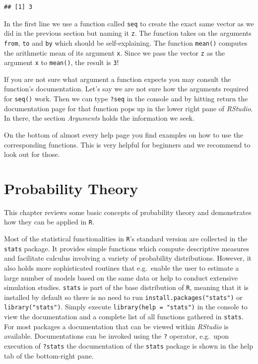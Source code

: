 \documentclass[]{book}
\theoremstyle{definition}
\theoremstyle{definition}
\theoremstyle{definition}
\theoremstyle{remark}
\begin{document}
\begin{verbatim}
## [1] 3
\end{verbatim}

In the first line we use a function called \texttt{seq} to create the
exact same vector as we did in the previous section but naming it
\texttt{z}. The function takes on the arguments \texttt{from},
\texttt{to} and \texttt{by} which should be self-explaining. The
function \texttt{mean()} computes the arithmetic mean of its argument
\texttt{x}. Since we pass the vector \texttt{z} as the argument
\texttt{x} to \texttt{mean()}, the result is \texttt{3}!

If you are not sure what argument a function expects you may consult the
function's documentation. Let's say we are not sure how the arguments
required for \texttt{seq()} work. Then we can type \texttt{?seq} in the
console and by hitting return the documentation page for that function
pops up in the lower right pane of \emph{RStudio}. In there, the section
\emph{Arguments} holds the information we seek.

On the bottom of almost every help page you find examples on how to use
the corresponding functions. This is very helpful for beginners and we
recommend to look out for those.

\chapter{Probability Theory}\label{pt}

This chapter reviews some basic concepts of probability theory and
demonstrates how they can be applied in \texttt{R}.

Most of the statistical functionalities in \texttt{R}'s standard version
are collected in the \texttt{stats} package. It provides simple
functions which compute descriptive measures and facilitate calculus
involving a variety of probability distributions. However, it also holds
more sophisticated routines that e.g.~enable the user to estimate a
large number of models based on the same data or help to conduct
extensive simulation studies. \texttt{stats} is part of the base
distribution of \texttt{R}, meaning that it is installed by default so
there is no need to run \texttt{install.packages("stats")} or
\texttt{library("stats")}. Simply execute
\texttt{library(help\ =\ "stats")} in the console to view the
documentation and a complete list of all functions gathered in
\texttt{stats}. For most packages a documentation that can be viewed
within \emph{RStudio} is available. Documentations can be invoked using
the \texttt{?} operator, e.g.~upon execution of \texttt{?stats} the
documentation of the \texttt{stats} package is shown in the help tab of
the bottom-right pane.
\end{document}
